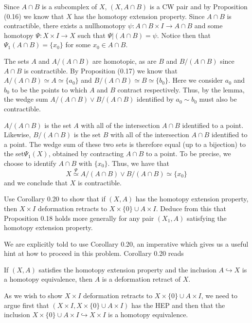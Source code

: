 \begin{homework}[e]
\begin{prf}
		\bigskip

		Since $A \cap B$ is a subcomplex of $X$, $(X,A\cap B)$ is a CW pair and by Proposition (0.16) we know that $X$ has the homotopy extension property. Since $A \cap B$ is contractible, there exists a nullhomotopy $\psi: A \cap B \times I \rightarrow A \cap B$ and some homotopy $\Psi: X \times I \rightarrow X$ such that $\Psi|(A\cap B) = \psi$. Notice then that $\Psi_1(A\cap B) = \{x_0\}$ for some $x_0 \in A\cap B$.

		\bigskip

		The sets $A$ and $A/(A \cap B)$ are homotopic, as are $B$ and $B/(A \cap B)$ since $A\cap B$ is contractible. By Proposition (0.17) we know that $A/(A \cap B) \simeq A \simeq \{a_0\}$ and $B/(A \cap B) \simeq B \simeq \{b_0\}$. Here we consider $a_0$ and $b_0$ to be the points to which $A$ and $B$ contract respectively. Thus, by the lemma, the wedge sum $A/(A \cap B) \vee B/(A \cap B)$ identified by $a_0 \sim b_0$ must also be contractible.

		\bigskip

		$A/(A\cap B)$ is the set $A$ with all of the intersection $A \cap B$ identified to a point. Likewise, $B/(A \cap B)$ is the set $B$ with all of the intersection $A \cap B$ identified to a point. The wedge sum of these two sets is therefore equal (up to a bijection) to the set$\Psi_1(X)$, obtained by contracting $A \cap B$ to a point. To be precise, we choose to identify $A \cap B$ with $\{x_0\}$. Thus, we have that 
		\begin{equation*}
		   X \overset{\Psi}{\simeq} A/(A \cap B) \vee B/(A \cap B) \simeq \{x_0\} 
		\end{equation*}
		and we conclude that $X$ is contractible.	   
	\end{prf}
	\newpage
	 Use Corollary 0.20 to show that if $(X,A)$ has the homotopy extension property, then $X\times I$ deformation retracts to $X\times \{0\}\cup A\times I$. Deduce from this that Proposition 0.18 holds more generally for any pair $(X_1,A)$ satisfying the homotopy extension property.
	\begin{prf}
		We are explicitly told to use Corollary 0.20, an imperative which gives us a useful hint at how to proceed in this problem. Corollary 0.20 reads
		\begin{cor}\label{cor:cor20-hatcher}
			If $(X,A)$ satisfies the homotopy extension property and the inclusion $A\hookrightarrow X$ is a homotopy equivalence, then $A$ is a deformation retract of $X$.
		\end{cor}
		As we wish to show $X\times I$ deformation retracts to $X\times \{0\}\cup A\times I$, we need to argue first that $(X\times I, X\times \{0\}\cup A\times I)$ has the HEP and then that the inclusion $X\times \{0\}\cup A\times I\hookrightarrow X\times I$ is a homotopy equivalence.


\end{prf}
\end{homework}
